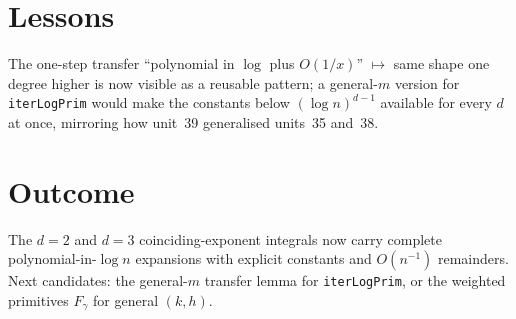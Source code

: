 \documentclass[11pt]{article}
\begin{document}
\section{Lessons}
The one-step transfer ``polynomial in $\log$ plus $O(1/x)$'' $\mapsto$ same shape one degree higher
is now visible as a reusable pattern; a general-$m$ version for \texttt{iterLogPrim} would make the
constants below $(\log n)^{d-1}$ available for every $d$ at once, mirroring how unit~39 generalised
units~35 and~38.

\section{Outcome}
The $d=2$ and $d=3$ coinciding-exponent integrals now carry complete polynomial-in-$\log n$
expansions with explicit constants and $O(n^{-1})$ remainders. Next candidates: the general-$m$
transfer lemma for \texttt{iterLogPrim}, or the weighted primitives $F_\gamma$ for general $(k,h)$.
\end{document}
